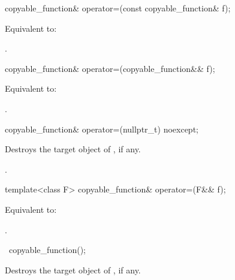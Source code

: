 %
\begin{itemdecl}
copyable_function& operator=(const copyable_function& f);
\end{itemdecl}

\begin{itemdescr}
\pnum
\effects
Equivalent to: 

\pnum
\returns
{}.
\end{itemdescr}

%
\begin{itemdecl}
copyable_function& operator=(copyable_function&& f);
\end{itemdecl}

\begin{itemdescr}
\pnum
\effects
Equivalent to: 

\pnum
\returns
{}.
\end{itemdescr}

%
\begin{itemdecl}
copyable_function& operator=(nullptr_t) noexcept;
\end{itemdecl}

\begin{itemdescr}
\pnum
\effects
Destroys the target object of , if any.

\pnum
\returns
{}.
\end{itemdescr}

%
\begin{itemdecl}
template<class F> copyable_function& operator=(F&& f);
\end{itemdecl}

\begin{itemdescr}
\pnum
\effects
Equivalent to: 

\pnum
\returns
{}.
\end{itemdescr}

%
\begin{itemdecl}
~copyable_function();
\end{itemdecl}

\begin{itemdescr}
\pnum
\effects
Destroys the target object of , if any.
\end{itemdescr}

